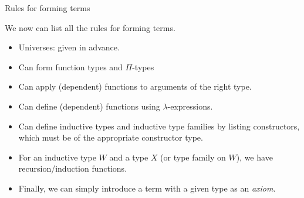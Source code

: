 \documentclass[10 pt., handout]{beamer}
\theoremstyle{plain}
\theoremstyle{remark}
\begin{document}
\begin{frame}{Rules for forming terms}

We now can list all the rules for forming terms.

\begin{itemize}

\item Universes: given in advance.

\item Can form function types and $\Pi$-types

\item Can apply (dependent) functions to arguments of the right type.

\item Can define (dependent) functions using $\lambda$-expressions.

\item Can define inductive types and inductive type families by listing constructors, which must be of the appropriate constructor type.

\item For an inductive type $W$ and a type $X$ (or type family on $W$), we have recursion/induction functions.

\item Finally, we can simply introduce a term with a given type as an \emph{axiom}.

\end{itemize}

\end{frame}
\end{document}

